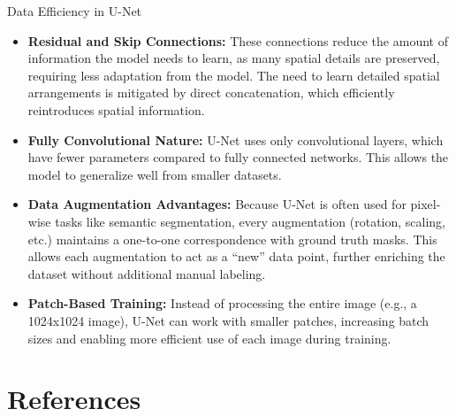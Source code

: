 \documentclass[serif, aspectratio=169]{beamer}
\begin{document}
\begin{frame}{Data Efficiency in U-Net}
\scriptsize
\begin{itemize}
    \item \textbf{Residual and Skip Connections:} These connections reduce the amount of information the model needs to learn, as many spatial details are preserved, requiring less adaptation from the model. The need to learn detailed spatial arrangements is mitigated by direct concatenation, which efficiently reintroduces spatial information.
    \vspace{0.3cm}
    \item \textbf{Fully Convolutional Nature:} U-Net uses only convolutional layers, which have fewer parameters compared to fully connected networks. This allows the model to generalize well from smaller datasets.
    \vspace{0.3cm}
    \item \textbf{Data Augmentation Advantages:} Because U-Net is often used for pixel-wise tasks like semantic segmentation, every augmentation (rotation, scaling, etc.) maintains a one-to-one correspondence with ground truth masks. This allows each augmentation to act as a ``new'' data point, further enriching the dataset without additional manual labeling.
    \vspace{0.3cm}
    \item \textbf{Patch-Based Training:} Instead of processing the entire image (e.g., a 1024x1024 image), U-Net can work with smaller patches, increasing batch sizes and enabling more efficient use of each image during training.
\end{itemize}
\end{frame}





\section{References}
\end{document}
